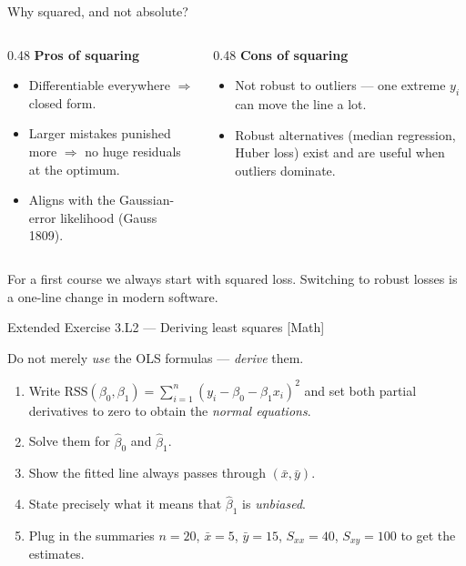 \documentclass[aspectratio=169,11pt]{beamer}
\begin{document}
\begin{frame}{Why squared, and not absolute?}
  \begin{columns}[T]
    \begin{column}{0.48\textwidth}
      \textbf{Pros of squaring}
      \begin{itemize}
        \item Differentiable everywhere $\Rightarrow$ closed form.
        \item Larger mistakes punished more $\Rightarrow$ no huge
              residuals at the optimum.
        \item Aligns with the Gaussian-error likelihood (Gauss 1809).
      \end{itemize}
    \end{column}
    \begin{column}{0.48\textwidth}
      \textbf{Cons of squaring}
      \begin{itemize}
        \item Not robust to outliers --- one extreme $y_i$ can move
              the line a lot.
        \item Robust alternatives (median regression, Huber loss)
              exist and are useful when outliers dominate.
      \end{itemize}
    \end{column}
  \end{columns}
  \begin{takeaway}
    For a first course we always start with squared loss. Switching
    to robust losses is a one-line change in modern software.
  \end{takeaway}
\end{frame}

\begin{frame}{Extended Exercise 3.L2 --- Deriving least squares [Math]}
  \begin{longexercise}
    Do not merely \emph{use} the OLS formulas --- \emph{derive} them.
    \begin{enumerate}
      \item Write $\mathrm{RSS}(\beta_0,\beta_1)=\sum_{i=1}^{n}(y_i-\beta_0-\beta_1 x_i)^2$
            and set both partial derivatives to zero to obtain the
            \emph{normal equations}.
      \item Solve them for $\hat\beta_0$ and $\hat\beta_1$.
      \item Show the fitted line always passes through $(\bar x,\bar y)$.
      \item State precisely what it means that $\hat\beta_1$ is
            \emph{unbiased}.
      \item Plug in the summaries $n=20$, $\bar x=5$, $\bar y=15$,
            $S_{xx}=40$, $S_{xy}=100$ to get the estimates.
    \end{enumerate}
  \end{longexercise}
\end{frame}
\end{document}
